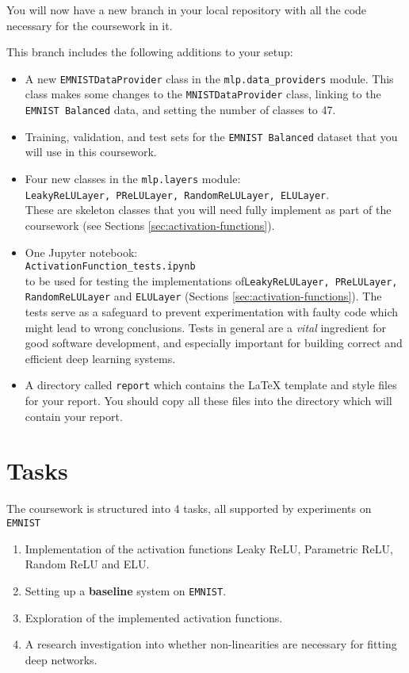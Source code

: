 \documentclass[11pt,]{article}
\begin{document}
You will now have a new branch in your local repository with all the
code necessary for the coursework in it.   

This branch includes the following additions to your setup:

\begin{itemize}
	\item
	A new \texttt{EMNISTDataProvider} class in the \verb+mlp.data_providers+ module.
	This class makes some changes to the \texttt{MNISTDataProvider} class, linking to the \texttt{EMNIST Balanced} data, and setting the number of classes to 47.
	\item
	Training, validation, and test sets for the \texttt{EMNIST Balanced} dataset that
	you will use in this coursework.
	\item 
	Four new classes in the \verb+mlp.layers+ module:\\
	\texttt{LeakyReLULayer, PReLULayer, RandomReLULayer, ELULayer}.\\
	These are  skeleton classes that you will need fully implement as part of the coursework (see Sections \ref{sec:activation-functions}).
	\item 
	One Jupyter notebook:\\
	\texttt{ActivationFunction\_tests.ipynb} \\
	to be used for testing the implementations of\texttt{LeakyReLULayer, PReLULayer, RandomReLULayer} and  \texttt{ELULayer}  (Sections \ref{sec:activation-functions}). The tests serve as a safeguard to prevent experimentation with faulty code which might lead to wrong conclusions. Tests in general are a \emph{vital} ingredient for good software development, and especially important for building correct and  efficient deep learning systems.
	
	\item A directory called  \texttt{report} which contains the LaTeX template and style files for your report.  You should copy all these files into the directory which will contain your report.
\end{itemize}



\newpage
\section{Tasks}
\label{sec:tasks}
The coursework is structured into 4 tasks, all supported by experiments on \texttt{EMNIST}
\begin{enumerate}
    \item Implementation of the activation functions Leaky ReLU, Parametric ReLU, Random ReLU and ELU.
    \item Setting up a \textbf{baseline} system on \texttt{EMNIST}.
    \item Exploration of the implemented activation functions.
    \item A research investigation into whether non-linearities are necessary for fitting deep networks.
    

\end{enumerate}
\end{document}
